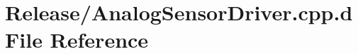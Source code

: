 \hypertarget{_release_2_analog_sensor_driver_8cpp_8d}{\section{\-Release/\-Analog\-Sensor\-Driver.cpp.\-d \-File \-Reference}
\label{_release_2_analog_sensor_driver_8cpp_8d}
}
